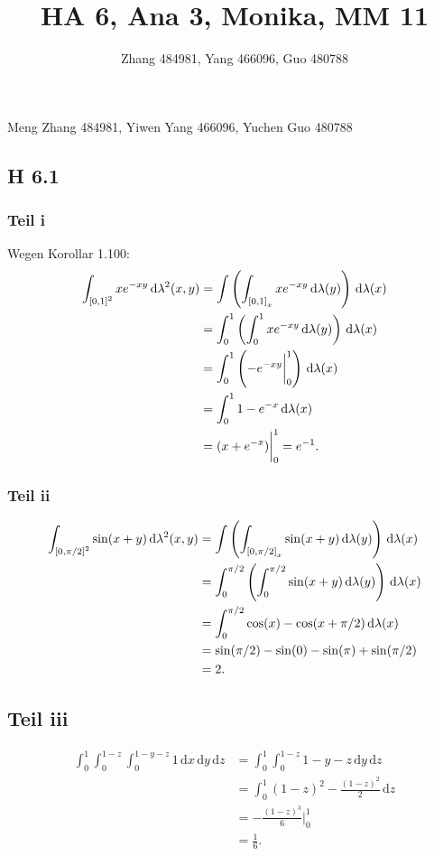 \documentclass[draft,a5paper]{article}
\title{HA 6, Ana 3, Monika, MM 11}
\author{Zhang 484981, Yang 466096, Guo 480788}
\theoremstyle{remark}
\newcommand{\dd}{\,\mathrm{d}}
\begin{document}
\maketitle
\begin{center}
  Meng Zhang 484981, Yiwen Yang 466096, Yuchen Guo 480788
\end{center}

\subsection{H 6.1}
\subsubsection{Teil i}
Wegen Korollar 1.100:
\begin{align*}
  \int_{\interval{0}{1}^{2}}{x e^{-xy} \dd \lambda^{2}(x, y)}
  &= \int\left(\int_{\interval{0}{1}_{x}} {x e^{-xy} \dd \lambda(y)}\right) \dd
    \lambda(x) \\
  &= \int^{1}_{0}\left(\int_{0}^{1} x e^{-xy} \dd \lambda(y)\right) \dd \lambda(x) \\
  &= \int_{0}^{1}\left(-e^{-xy}\bigg\vert_{0}^{1}\right) \dd \lambda(x) \\
  &= \int_{0}^{1}{1-e^{-x}} \dd \lambda(x) \\
  &= (x + e^{-x}) \bigg\vert_{0}^{1} = e^{-1}.
\end{align*}
\subsubsection{Teil ii}
\begin{align*}
  \int_{\interval{0}{\pi/2}^{2}}{\sin (x+y) \dd \lambda^{2}(x, y)}
  &= \int\left(\int_{\interval{0}{\pi/2}_{x}}{\sin (x+y) \dd \lambda(y)}\right) \dd
    \lambda(x) \\
  &= \int_{0}^{\pi/2}\left(\int_{0}^{\pi/2}{\sin(x+y) \dd
    \lambda(y)}\right) \dd \lambda(x) \\
  &= \int_{0}^{\pi/2}{\cos(x) - \cos(x+\pi/2)\dd \lambda(x)} \\
  &= \sin(\pi/2) - \sin(0) - \sin(\pi) + \sin(\pi/2) \\
  &= 2.
\end{align*}
\subsection{Teil iii}
\begin{align*}
  \int_{0}^{1}\int_{0}^{1-z}\int_{0}^{1-y-z}{1}\dd x \dd y \dd z
  &= \int_{0}^{1} \int_{0}^{1-z} 1-y-z \dd y \dd z \\
  &= \int_{0}^{1}  (1-z)^{2} - \frac{(1-z)^{2}}{2} \dd z \\
  &= -\frac{(1-z)^{3}}{6} \bigg\vert^{1}_{0}\\
  &= \frac{1}{6}.
\end{align*}
\end{document}
